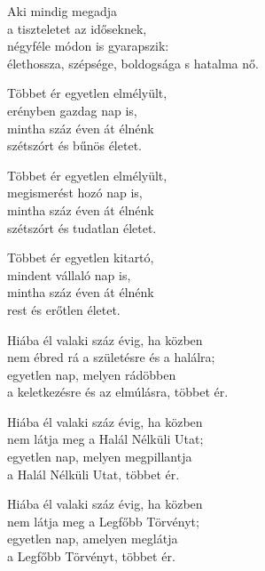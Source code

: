 \begin{dhpverse}

 Aki mindig megadja\\
a tiszteletet az időseknek,\\
négyféle módon is gyarapszik:\\
élethossza, szépsége, boldogsága s hatalma nő.

 Többet ér egyetlen elmélyült,\\
erényben gazdag nap is,\\
mintha száz éven át élnénk\\
szétszórt és bűnös életet.

 Többet ér egyetlen elmélyült,\\
megismerést hozó nap is,\\
mintha száz éven át élnénk\\
szétszórt és tudatlan életet.

 Többet ér egyetlen kitartó,\\
mindent vállaló nap is,\\
mintha száz éven át élnénk\\
rest és erőtlen életet.

 Hiába él valaki száz évig, ha közben\\
nem ébred rá a születésre és a halálra;\\
egyetlen nap, melyen rádöbben\\
a keletkezésre és az elmúlásra, többet ér.

 Hiába él valaki száz évig, ha közben\\
nem látja meg a Halál Nélküli Utat;\\
egyetlen nap, melyen megpillantja\\
a Halál Nélküli Utat, többet ér.

\end{dhpverse}
\newpage
\begin{dhpverse}

 Hiába él valaki száz évig, ha közben\\
nem látja meg a Legfőbb Törvényt;\\
egyetlen nap, amelyen meglátja\\
a Legfőbb Törvényt, többet ér.

\end{dhpverse}

